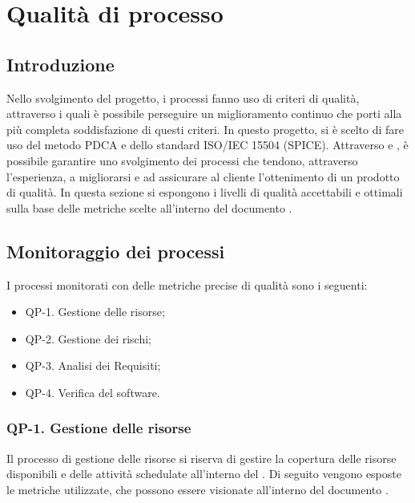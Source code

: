 \section{Qualità di processo}

\subsection{Introduzione}

Nello svolgimento del progetto, i processi fanno uso di criteri di qualità, attraverso i quali è possibile perseguire un miglioramento continuo che porti alla più completa soddisfazione di questi criteri. In questo progetto, si è scelto di fare uso del metodo PDCA e dello standard ISO/IEC 15504 (SPICE). Attraverso  e , è possibile garantire uno svolgimento dei processi che tendono, attraverso l'esperienza, a migliorarsi e ad assicurare al cliente l'ottenimento di un prodotto di qualità.
In questa sezione si espongono i livelli di qualità accettabili e ottimali sulla base delle metriche scelte all'interno del documento .

\subsection{Monitoraggio dei processi}

I processi monitorati con delle metriche precise di qualità sono i seguenti:

\begin{itemize}
	\item QP-1. Gestione delle risorse;
	\item QP-2. Gestione dei rischi;
 	\item QP-3. Analisi dei Requisiti;
	\item QP-4. Verifica del software.
\end{itemize}

	\subsubsection{QP-1. Gestione delle risorse}

		Il processo di gestione delle risorse si riserva di gestire la copertura delle risorse disponibili e delle attività schedulate all'interno del . Di seguito vengono esposte le metriche utilizzate, che possono essere visionate all'interno del documento .

